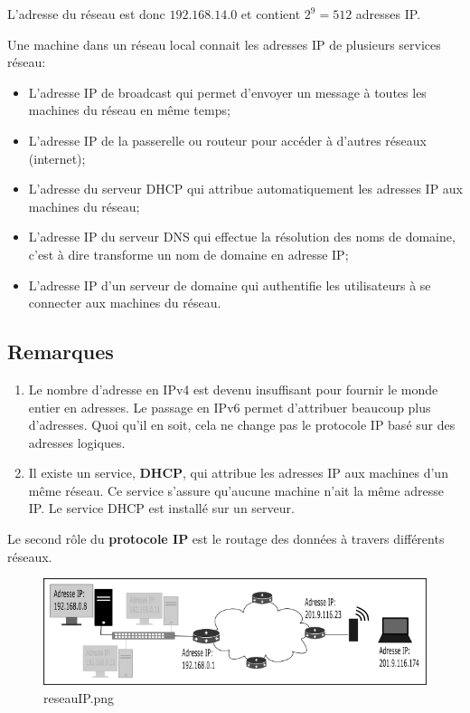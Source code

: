 \documentclass[11pt]{article}
\providecommand{\tightlist}{%
      \setlength{\itemsep}{0pt}\setlength{\parskip}{0pt}}
\begin{document}
    L'adresse du réseau est donc \(192.168.14.0\) et contient \(2^{9}=512\)
adresses IP.

    Une machine dans un réseau local connait les adresses IP de plusieurs
services réseau:

\begin{itemize}
\tightlist
\item
  L'adresse IP de broadcast qui permet d'envoyer un message à toutes les
  machines du réseau en même temps;
\item
  L'adresse IP de la passerelle ou routeur pour accéder à d'autres
  réseaux (internet);
\item
  L'adresse du serveur DHCP qui attribue automatiquement les adresses IP
  aux machines du réseau;
\item
  L'adresse IP du serveur DNS qui effectue la résolution des noms de
  domaine, c'est à dire transforme un nom de domaine en adresse IP;
\item
  L'adresse IP d'un serveur de domaine qui authentifie les utilisateurs
  à se connecter aux machines du réseau.
\end{itemize}

\hypertarget{remarques}{%
\subsection{Remarques}\label{remarques}}

\begin{enumerate}
\def\labelenumi{\arabic{enumi}.}
\item
  Le nombre d'adresse en IPv4 est devenu insuffisant pour fournir le
  monde entier en adresses. Le passage en IPv6 permet d'attribuer
  beaucoup plus d'adresses. Quoi qu'il en soit, cela ne change pas le
  protocole IP basé sur des adresses logiques.
\item
  Il existe un service, \textbf{DHCP}, qui attribue les adresses IP aux
  machines d'un même réseau. Ce service s'assure qu'aucune machine n'ait
  la même adresse IP. Le service DHCP est installé sur un serveur.
\end{enumerate}

Le second rôle du \textbf{protocole IP} est le routage des données à
travers différents réseaux.

    \begin{figure}
\centering
\includegraphics{img/reseauIP.png}
\caption{reseauIP.png}
\end{figure}
\end{document}
